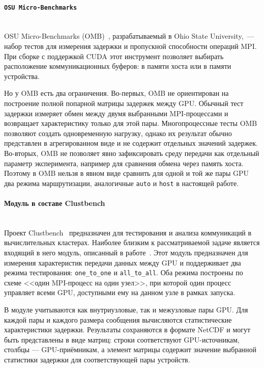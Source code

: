 \documentclass[a4paper,14pt]{extarticle}
\begin{document}
\paragraph{\texttt{OSU Micro-Benchmarks}}\mbox{}\\
\indent OSU Micro-Benchmarks (OMB)~\cite{omb}, разрабатываемый в Ohio State University,~--- набор тестов для измерения задержки и пропускной способности операций MPI. При сборке с поддержкой CUDA этот инструмент позволяет выбирать расположение коммуникационных буферов: в памяти хоста или в памяти устройства.

Но у OMB есть два ограничения. Во-первых, OMB не ориентирован на построение полной попарной матрицы задержек между GPU. Обычный тест задержки измеряет обмен между двумя выбранными MPI-процессами и возвращает характеристику только для этой пары. Многопроцессные тесты OMB позволяют создать одновременную нагрузку, однако их результат обычно представлен в агрегированном виде и не содержит отдельных значений задержек. Во-вторых, OMB не позволяет явно зафиксировать среду передачи как отдельный параметр эксперимента, например для сравнения обмена через память хоста. Поэтому в OMB нельзя в явном виде сравнить для одной и той же пары GPU два режима маршрутизации, аналогичные \texttt{auto} и \texttt{host} в настоящей работе.

\paragraph{Модуль в составе Clustbench}\mbox{}\\
\indent Проект Clustbench~\cite{clustbench} предназначен для тестирования и анализа коммуникаций в вычислительных кластерах. Наиболее близким к рассматриваемой задаче является входящий в него модуль, описанный в работе~\cite{begaev}. Этот модуль предназначен для измерения характеристик передачи данных между GPU и поддерживает два режима тестирования: \texttt{one\_to\_one} и \texttt{all\_to\_all}. Оба режима построены по схеме <<один MPI-процесс на один узел>>, при которой один процесс управляет всеми GPU, доступными ему на данном узле в рамках запуска.

В модуле учитываются как внутриузловые, так и межузловые пары GPU. Для каждой пары и каждого размера сообщения вычисляются статистические характеристики задержки. Результаты сохраняются в формате NetCDF и могут быть представлены в виде матриц: строки соответствуют GPU-источникам, столбцы --- GPU-приёмникам, а элемент матрицы содержит значение выбранной статистики задержки для соответствующей пары устройств.
\end{document}
